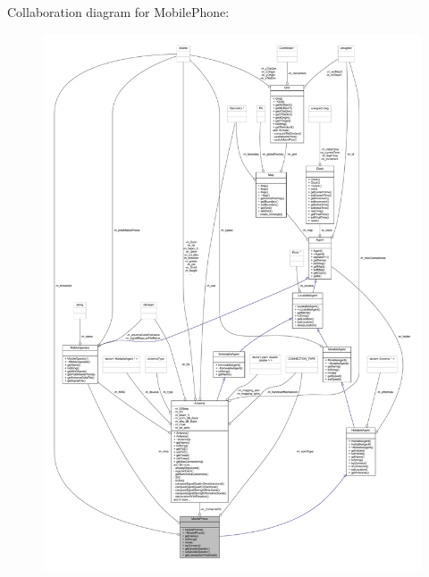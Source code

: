 Collaboration diagram for Mobile\+Phone\+:\nopagebreak
\begin{figure}[H]
\begin{center}
\leavevmode
\includegraphics[width=350pt]{class_mobile_phone__coll__graph}
\end{center}
\end{figure}
